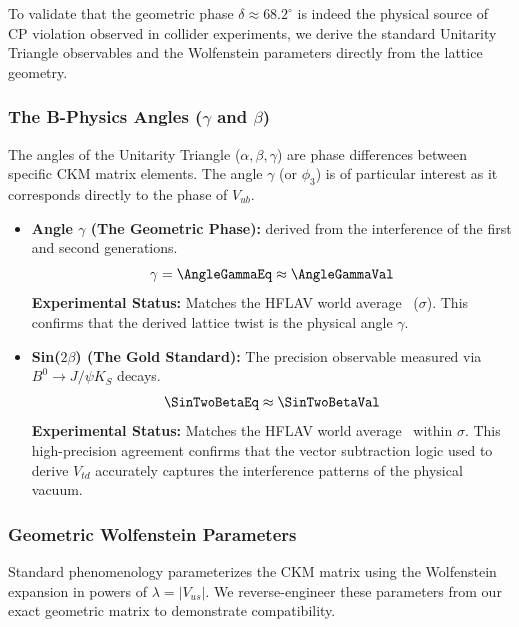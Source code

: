 To validate that the geometric phase $\delta \approx 68.2^\circ$ is indeed the physical source of CP violation observed in collider experiments, we derive the standard Unitarity Triangle observables and the Wolfenstein parameters directly from the lattice geometry.

\subsubsection{The B-Physics Angles (\texorpdfstring{$\gamma$ and $\beta$}{gamma and beta})}
The angles of the Unitarity Triangle ($\alpha, \beta, \gamma$) are phase differences between specific CKM matrix elements. The angle $\gamma$ (or $\phi_3$) is of particular interest as it corresponds directly to the phase of $V_{ub}$.

\begin{itemize}
    \item \textbf{Angle $\gamma$ (The Geometric Phase):} derived from the interference of the first and second generations.
    \begin{equation}
    \gamma = \AngleGammaEq \approx \AngleGammaVal
    \end{equation}
    \textbf{Experimental Status:} Matches the HFLAV world average \AngleGammaExp \ (\AngleGammaSig$\sigma$). This confirms that the derived lattice twist is the physical angle $\gamma$.

    \item \textbf{Sin($2\beta$) (The Gold Standard):} The precision observable measured via $B^0 \to J/\psi K_S$ decays.
    \begin{equation}
        \SinTwoBetaEq \approx \SinTwoBetaVal
    \end{equation}
    \textbf{Experimental Status:} Matches the HFLAV world average \SinTwoBetaExp \ within \SinTwoBetaSig$\sigma$. This high-precision agreement confirms that the vector subtraction logic used to derive $V_{td}$ accurately captures the interference patterns of the physical vacuum.
\end{itemize}

\subsubsection{Geometric Wolfenstein Parameters}
Standard phenomenology parameterizes the CKM matrix using the Wolfenstein expansion in powers of $\lambda = |V_{us}|$. We reverse-engineer these parameters from our exact geometric matrix to demonstrate compatibility.

